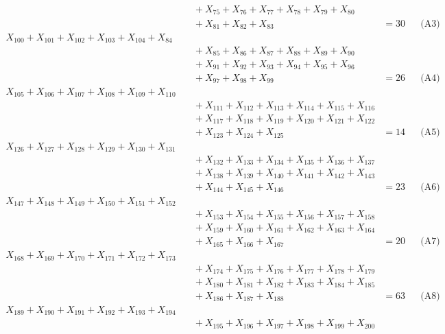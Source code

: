 \documentclass[a4paper,10pt]{article}
\begin{document}
{\begin{align}
&\quad  + X_{75} + X_{76} + X_{77} + X_{78} + X_{79} + X_{80} \\[0.5ex]
&\quad  + X_{81} + X_{82} + X_{83} &= 30 && \text{(A3)} \\
X_{100} + X_{101} + X_{102} + X_{103} + X_{104} + X_{84} \\[0.5ex]
&\quad  + X_{85} + X_{86} + X_{87} + X_{88} + X_{89} + X_{90} \\[0.5ex]
&\quad  + X_{91} + X_{92} + X_{93} + X_{94} + X_{95} + X_{96} \\[0.5ex]
&\quad  + X_{97} + X_{98} + X_{99} &= 26 && \text{(A4)} \\
X_{105} + X_{106} + X_{107} + X_{108} + X_{109} + X_{110} \\[0.5ex]
&\quad  + X_{111} + X_{112} + X_{113} + X_{114} + X_{115} + X_{116} \\[0.5ex]
&\quad  + X_{117} + X_{118} + X_{119} + X_{120} + X_{121} + X_{122} \\[0.5ex]
&\quad  + X_{123} + X_{124} + X_{125} &= 14 && \text{(A5)} \\
X_{126} + X_{127} + X_{128} + X_{129} + X_{130} + X_{131} \\[0.5ex]
&\quad  + X_{132} + X_{133} + X_{134} + X_{135} + X_{136} + X_{137} \\[0.5ex]
&\quad  + X_{138} + X_{139} + X_{140} + X_{141} + X_{142} + X_{143} \\[0.5ex]
&\quad  + X_{144} + X_{145} + X_{146} &= 23 && \text{(A6)} \\
X_{147} + X_{148} + X_{149} + X_{150} + X_{151} + X_{152} \\[0.5ex]
&\quad  + X_{153} + X_{154} + X_{155} + X_{156} + X_{157} + X_{158} \\[0.5ex]
&\quad  + X_{159} + X_{160} + X_{161} + X_{162} + X_{163} + X_{164} \\[0.5ex]
&\quad  + X_{165} + X_{166} + X_{167} &= 20 && \text{(A7)} \\
X_{168} + X_{169} + X_{170} + X_{171} + X_{172} + X_{173} \\[0.5ex]
&\quad  + X_{174} + X_{175} + X_{176} + X_{177} + X_{178} + X_{179} \\[0.5ex]
&\quad  + X_{180} + X_{181} + X_{182} + X_{183} + X_{184} + X_{185} \\[0.5ex]
&\quad  + X_{186} + X_{187} + X_{188} &= 63 && \text{(A8)} \\
X_{189} + X_{190} + X_{191} + X_{192} + X_{193} + X_{194} \\[0.5ex]
&\quad  + X_{195} + X_{196} + X_{197} + X_{198} + X_{199} + X_{200} \\[0.5ex]

\end{align}}
\end{document}
